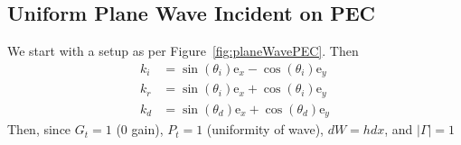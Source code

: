\documentclass{article}
\numberwithin{equation}{section}
\begin{document}
        \subsection{Uniform Plane Wave Incident on PEC}    
            We start with a setup as per Figure~\ref{fig:planeWavePEC}. Then
            \begin{subequations}
                \begin{align}
                    k_i &= \sin (\theta_i) \text{e}_x - \cos (\theta_i) \text{e}_y \\
                    k_r &= \sin (\theta_i) \text{e}_x + \cos (\theta_i) \text{e}_y \\
                    k_d &= \sin (\theta_d) \text{e}_x + \cos (\theta_d) \text{e}_y
                \end{align}
            \end{subequations}
            Then, since $G_t = 1$ (0 gain), $P_t = 1$ (uniformity of wave), $dW = h dx$,
            and
            $\left| \Gamma \right| = 1$
            \vspace*{\fill}
\end{document}
